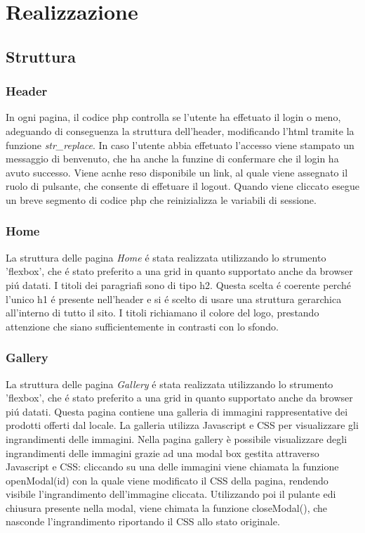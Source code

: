 \section{Realizzazione}
    \subsection{Struttura}
		\subsubsection{Header}
			In ogni pagina, il codice php controlla se l'utente ha effetuato il login o meno, adeguando di conseguenza la struttura dell'header, modificando l'html tramite la funzione \emph{str\_replace}.
			In caso l'utente abbia effetuato l'accesso viene stampato un messaggio di benvenuto, che ha anche la funzine di confermare che il login ha avuto successo. 
			Viene acnhe reso disponibile un link, al quale viene assegnato il ruolo di pulsante, che consente di effetuare il logout.
			Quando viene cliccato esegue un breve segmento di codice php che reinizializza le variabili di sessione.
		\subsubsection{Home}
			La struttura delle pagina \emph{Home} \'e stata realizzata utilizzando lo strumento 'flexbox', che \'e stato preferito a una grid in quanto supportato anche da browser pi\'u datati.
			I titoli dei paragriafi sono di tipo h2.
			Questa scelta \'e coerente  perch\'e l'unico h1 \'e presente nell'header e si \'e scelto di usare una struttura gerarchica all'interno di tutto il sito.
			I titoli richiamano il colore del logo, prestando attenzione che siano sufficientemente in contrasti con lo sfondo.
		\subsubsection{Gallery}
			La struttura delle pagina \emph{Gallery} \'e stata realizzata utilizzando lo strumento 'flexbox', che \'e stato preferito a una grid in quanto supportato anche da browser pi\'u datati.
			Questa pagina contiene una galleria di immagini rappresentative dei prodotti offerti dal locale. 
			La galleria utilizza Javascript e CSS per visualizzare gli ingrandimenti delle immagini.
			Nella pagina gallery è possibile visualizzare degli ingrandimenti delle immagini grazie ad una modal box gestita attraverso Javascript e CSS: cliccando su una delle immagini viene chiamata la funzione openModal(id) con la quale viene modificato il CSS della pagina, rendendo visibile l'ingrandimento dell'immagine cliccata.
			Utilizzando poi il pulante edi chiusura presente nella modal, viene chimata la funzione closeModal(), che nasconde l'ingrandimento riportando il CSS allo stato originale.

